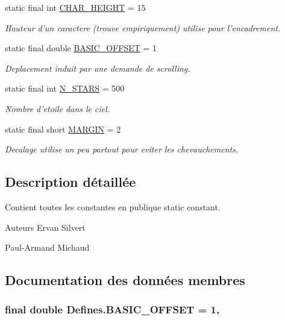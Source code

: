 \begin{DoxyCompactItemize}
static final int \hyperlink{classDefines_aefdb64aa2941d347830f576d61bd941f}{C\-H\-A\-R\-\_\-\-H\-E\-I\-G\-H\-T} = 15
\begin{DoxyCompactList}\small\item\em Hauteur d'un caractere (trouve empiriquement) utilise pour l'encadrement. \end{DoxyCompactList}\item 
static final double \hyperlink{classDefines_ab31317d73c21ddc857f1d9cac254cd51}{B\-A\-S\-I\-C\-\_\-\-O\-F\-F\-S\-E\-T} = 1
\begin{DoxyCompactList}\small\item\em Deplacement induit par une demande de scrolling. \end{DoxyCompactList}\item 
static final int \hyperlink{classDefines_a9b91f7213bd4f6c0b70df0e9903c7691}{N\-\_\-\-S\-T\-A\-R\-S} = 500
\begin{DoxyCompactList}\small\item\em Nombre d'etoile dans le ciel. \end{DoxyCompactList}\item 
static final short \hyperlink{classDefines_a9fd7f260f375ce1a158c1b5d7f7b5723}{M\-A\-R\-G\-I\-N} = 2
\begin{DoxyCompactList}\small\item\em Decalage utilise un peu partout pour eviter les chevauchements. \end{DoxyCompactList}\end{DoxyCompactItemize}


\subsection{Description détaillée}
Contient toutes les constantes en publique static constant. 

\begin{DoxyAuthor}{Auteurs}
Ervan Silvert 

Paul-\/\-Armand Michaud 
\end{DoxyAuthor}


\subsection{Documentation des données membres}
\hypertarget{classDefines_ab31317d73c21ddc857f1d9cac254cd51}{
\subsubsection[{B\-A\-S\-I\-C\-\_\-\-O\-F\-F\-S\-E\-T}]{\setlength{\rightskip}{0pt plus 5cm}final double Defines.\-B\-A\-S\-I\-C\-\_\-\-O\-F\-F\-S\-E\-T = 1\hspace{0.3cm}{\ttfamily [static]}, {\ttfamily [package]}}}\label{classDefines_ab31317d73c21ddc857f1d9cac254cd51}


